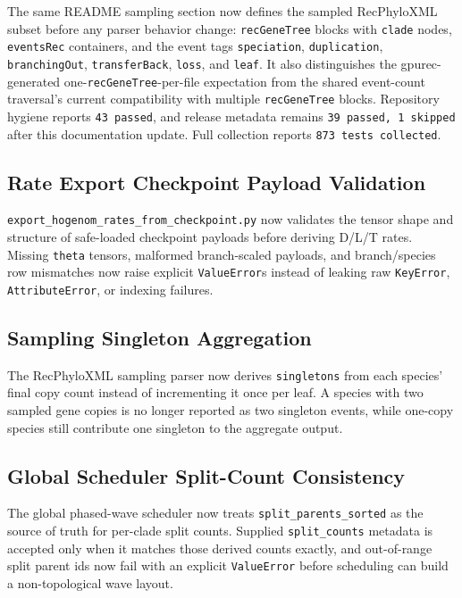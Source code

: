 \documentclass[11pt]{article}
\begin{document}
The same README sampling section now defines the sampled RecPhyloXML subset
before any parser behavior change: \texttt{recGeneTree} blocks with
\texttt{clade} nodes, \texttt{eventsRec} containers, and the event tags
\texttt{speciation}, \texttt{duplication}, \texttt{branchingOut},
\texttt{transferBack}, \texttt{loss}, and \texttt{leaf}.  It also distinguishes
the gpurec-generated one-\texttt{recGeneTree}-per-file expectation from the
shared event-count traversal's current compatibility with multiple
\texttt{recGeneTree} blocks.  Repository hygiene reports
\texttt{43 passed}, and release metadata remains
\texttt{39 passed, 1 skipped} after this documentation update.  Full
collection reports \texttt{873 tests collected}.

\subsection{Rate Export Checkpoint Payload Validation}

\texttt{export\_hogenom\_rates\_from\_checkpoint.py} now validates the tensor
shape and structure of safe-loaded checkpoint payloads before deriving D/L/T
rates.  Missing \texttt{theta} tensors, malformed branch-scaled payloads, and
branch/species row mismatches now raise explicit \texttt{ValueError}s instead
of leaking raw \texttt{KeyError}, \texttt{AttributeError}, or indexing failures.

\subsection{Sampling Singleton Aggregation}

The RecPhyloXML sampling parser now derives \texttt{singletons} from each
species' final copy count instead of incrementing it once per leaf.  A species
with two sampled gene copies is no longer reported as two singleton events,
while one-copy species still contribute one singleton to the aggregate output.

\subsection{Global Scheduler Split-Count Consistency}

The global phased-wave scheduler now treats \texttt{split\_parents\_sorted} as
the source of truth for per-clade split counts.  Supplied
\texttt{split\_counts} metadata is accepted only when it matches those derived
counts exactly, and out-of-range split parent ids now fail with an explicit
\texttt{ValueError} before scheduling can build a non-topological wave layout.
\end{document}
